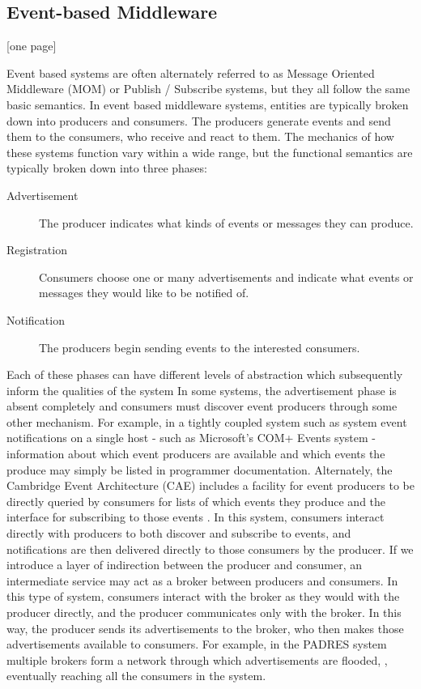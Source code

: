 \documentclass{acm_proc_article-sp}
\begin{document}

\subsection{Event-based Middleware}

[one page]

Event based systems are often alternately referred to as Message Oriented Middleware (MOM) or Publish / Subscribe systems, but they all follow the same basic semantics. In event based middleware systems, entities are typically broken down into producers and consumers. The producers generate events and send them to the consumers, who receive and react to them. The mechanics of how these systems function vary within a wide range, but the functional semantics are typically broken down into three phases:

\begin{description}
\item[Advertisement] The producer indicates what kinds of events or messages they can produce.
\item[Registration] Consumers choose one or many advertisements and indicate what events or messages they would like to be notified of.
\item[Notification] The producers begin sending events to the interested consumers.
\end{description}

Each of these phases can have different levels of abstraction which subsequently inform the qualities of the system In some systems, the advertisement phase is absent completely and consumers must discover event producers through some other mechanism. For example, in a tightly coupled system such as system event notifications on a single host - such as Microsoft's COM+ Events system - information about which event producers are available and which events the produce may simply be listed in programmer documentation. Alternately, the Cambridge Event Architecture (CAE) includes a facility for event producers to be directly queried by consumers for lists of which events they produce and the interface for subscribing to those events \cite{Bacon:2000p6818}. In this system, consumers interact directly with producers to both discover and subscribe to events, and notifications are then delivered directly to those consumers by the producer. If we introduce a layer of indirection between the producer and consumer, an intermediate service may act as a broker between producers and consumers. In this type of system, consumers interact with the broker as they would with the producer directly, and the producer communicates only with the broker. In this way, the producer sends its advertisements to the broker, who then makes those advertisements available to consumers. For example, in the PADRES system multiple brokers form a network through which advertisements are flooded, \cite{Jacobsen:2010p8313}, eventually reaching all the consumers in the system.
\end{document}

